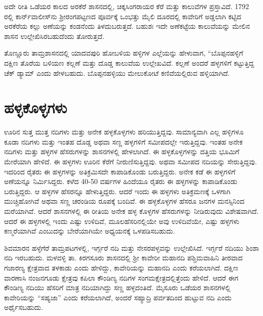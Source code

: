 ಅದೇ ರೀತಿ ಒಡೆಯರ ಕಾಲದ ಅರಕೆರೆ ಶಾಸನದಲ್ಲಿ, ಚಿಕ್ಕಸಿಂಗರಾಯರ ಕೆರೆ ಮತ್ತು ಕಾಲುವೆಗಳ ಪ್ರಸ್ತಾವಿದೆ. 1792 ರಲ್ಲಿ ಕಾರ್ನ್​ವಾಲೀಸ್​ನು ಶ‍್ರೀರಂಗಪಟ್ಟಣದ ಪೂರ್ವಕ್ಕೆ ಒಂಭತ್ತು ಮೈಲಿ ದೂರದಲ್ಲಿ ಕಾವೇರಿಗೆ ಅಡ್ಡಲಾಗಿ ಕಟ್ಟಿದ ಅರಕೆರೆಯ ಕಲ್ಲು ಅಣೆಯನ್ನು ಕಂಡನೆಂದು ತಿಳದುಬರುತ್ತದೆ. ಬಹುಶಃ ಇದೇ ಅಣೆಕಟ್ಟೆಯ ಕಾಲುವೆಯನ್ನು ಮೇಲಿನ ಶಾಸನ ಉಲ್ಲೇಖಿಸಿರಬಹುದೆಂದು ತೋರುತ್ತದೆ.

ತೊಣ್ಣೂರು ತಾಮ್ರಶಾಸನದಲ್ಲಿ ಯಾದವಪುರಿ ಹೋಬಳಿಯ ಹಳ್ಳಿಗಳ ಎಲ್ಲೆಯನ್ನು ಹೇಳುವಾಗ, “ಬೊಪ್ಪನಹಳ್ಳಿಗೆ ದಕ್ಷಿಣ ತೊರೆಯ ಬಳಿಯಣ ಕಲ್ಲಣೆ ಮತ್ತು ದೊಡ್ಡ ಕಾಲುವೆಯ ಉಲ್ಲೇಖವಿದೆ. ಕಲ್ಲಣೆ ಅಂದರೆ ಹಳ್ಳಗಳಿಗೆ ಕಟ್ಟುತ್ತಿದ್ದ ಚೆಕ್​ ಡ್ಯಾಮ್ ಎಂದು ಹೇಳಬಹುದು. ಬೊಪ್ಪನಹಳ್ಳಿಯು ಮೇಲುಕೋಟೆ ಕಣಿವೆಯಲ್ಲಿರುವ ಹಳ್ಳಿಯಾಗಿದೆ.

\section*{ಹಳ್ಳಕೊಳ್ಳಗಳು}

ಊರಿನ ಸುತ್ತ ಮುತ್ತ ನದಿಗಳು ಮತ್ತು ಅನೇಕ ಹಳ್ಳಕೊಳ್ಳಗಳು ಹರಿಯುತ್ತಿದ್ದವು. ಸಾಮಾನ್ಯವಾಗಿ ಎಲ್ಲ ಹಳ್ಳಿಗಳೂ ಕೂಡಾ ನದಿಗಳು ಮತ್ತು ಇಂತಹ ದೊಡ್ಡ ಅಥವಾ ಸಣ್ಣ ಹಳ್ಳಗಳಿಗೆ ಸಮೀಪದಲ್ಲೇ ಇರುತ್ತಿದ್ದವು. ಇಂತಹ ಅನೇಕ ನದಿಗಳು ಮತ್ತು ಹಳ್ಳಗಳ ಹೆಸರುಗಳನ್ನು ಶಾಸನಗಳಲ್ಲಿ ಹೇಳಲಾಗಿದೆ. ಈ ಹಳ್ಳಕೊಳ್ಳಗಳನ್ನು ದತ್ತಿಯ ಭೂಮಿಗೆ ಮೇರೆಯಾಗಿ ಹೇಳಿದೆ. ಈ ಹಳ್ಳಗಳು ಊರಿನ ಕೆರೆಗೆ ನೀರುಣಿಸುತ್ತಿದ್ದವು. ಅಥವಾ ಸಮೀಪದ ನದಿಯನ್ನು ಸೇರುತ್ತಿದ್ದವು. ಇದರಿಂದ ರೈತರು ಈ ಹಳ್ಳಗಳನ್ನು ಅತಿಕ್ರಮಿಸದೇ ಕಾಪಾಡಿಕೊಂಡು ಬರುತ್ತಿದ್ದರು. ಅನೇಕ ಕಡೆ ಈ ಹಳ್ಳಗಳಿಗೆ ಅಣೆಯನ್ನೂ ನಿರ್ಮಿಸಿದ್ದರು. ಕಳೆದ 40-50 ವರ್ಷಗಳ ಹಿಂದೆಯೂ ರೈತರು ಈ ಹಳ್ಳಗಳನ್ನು ಕಾಪಾಡಿಕೊಂಡು ಬರುತ್ತಿದ್ದರು. ಆ ಹಳ್ಳಗಳ ಹೆಸರನ್ನೂ ಹೇಳುತ್ತಿದ್ದರು. ಆದರೆ ಇಂದು ಈ ಹಳ್ಳಗಳು ಅತಿಕ್ರಮಣಕ್ಕೆ ಒಳಗಾಗಿ ಮುಚ್ಚಿಹೋಗಿವೆ ಅಥವಾ ಸಣ್ಣ ಚರಂಡಿಯ ರೂಪಕ್ಕೆ ಬಂದಿವೆ. ಈ ಹಳ್ಳಕೊಳ್ಳಗಳ ಹೆಸರೂ ಜನಗಳ ಮನಸ್ಸಿನಿಂದ ಮರೆಯಾಗಿವೆ. ಆದರೆ ಶಾಸನಗಳಲ್ಲಿ ಈ ರೀತಿಯ ಅನೇಕ ಹಳ್ಳ ಕೊಳ್ಳಗಳ ಹೆಸರುಗಳನ್ನು ನೀಡಿರುವುದು ವಿಶೇಷವಾಗಿದೆ. ಆದರೆ ಈ ಹಳ್ಳಗಳಲ್ಲಿ ಇಂದು ಎಷ್ಟು ಉಳಿದಿವೆ, ಮೂಲಹೆಸರಿನಲ್ಲಿಯೇ ಅವು ಉಳಿದಿವೆಯೇ, ಎಷ್ಟು ಹಳ್ಳಗಳು ಕಣ್ಮರೆಯಾಗಿವೆ ಎಂಬುದನ್ನು ಬೇರೆಯಾಗಿಯೇ ಅಧ್ಯಯನಕ್ಕೆ ಒಳಪಡಿಸಬಹುದು.

ಶಿವಮಾರನ ಹಳ್ಳೆಗೆರೆ ತಾಮ್ರಪಟಗಳಲ್ಲಿ, ಇರ್ಗ್ಗರೆ ನದಿ ಮತ್ತು ನೇಸರಪಳ್ಳವನ್ನು ಉಲ್ಲೇಖಿಸಿದೆ. ಇರ್ಗ್ಗರೆ ನದಿಯು ಶಿಂಶಾ ನದಿ ಇರಬಹುದು. ಮಳವಳ್ಳಿ ತಾ. ಕಿರಗಸೂರು ಶಾಸನದಲ್ಲಿ ಶ‍್ರೀ ಕಾವೇರೀ ಮಹಾನದಿ ಪಶ್ಚಿಮವಾಹಿನಿ ತೀರವಾದ ಗಜಾರಣ್ಯ ಕ್ಷೇತ್ರವಾದ ತಳಕಾಡು ಎಂದು ಹೇಳಿದ್ದು, ಕಾವೇರಿಯನ್ನು ಮಹಾನದಿ ಎಂದು ಕರೆಯಲಾಗಿದೆ. ದಕ್ಷಿಣ ವಾರಣಾಸಿ ನಂಜನಗೂಡು ಕ್ಷೇತ್ರವು ಕಪಿಲಾ ಕೌಂಡಿಣ್ಯ ನದಿಗಳ ಸಂಗಮಕ್ಷೇತ್ರದಲ್ಲಿತ್ತೆಂದು ಹೇಳಿದೆ. ಆದರೆ ಈಗ ಕೌಂಡಿಣ್ಯ ನದಿಯು ಹೆಸರಿಗೆ ಮಾತ್ರ ನದಿಯಾಗಿದ್ದು ಸಣ್ಣ ಹಳ್ಳದಂತಿದೆ. ಮೈಸೂರು ಒಡೆಯರ ಶಾಸನಗಳಲ್ಲಿ ಕಾವೇರಿಯನ್ನು “ಸಹ್ಯಜಾ” ಎಂದು ಕರೆಯಲಾಗಿದೆ, ಅಂದರೆ ಸಹ್ಯಾದ್ರಿ ಪರ್ವತದಿಂದ ಹುಟ್ಟುವ ನದಿ ಎಂದು ಅರ್ಥೈಸಬಹುದು.

